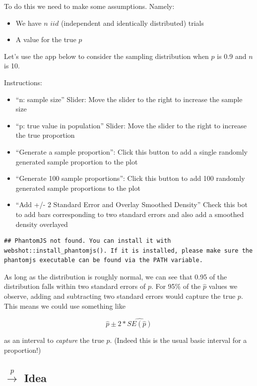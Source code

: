 \documentclass[
]{article}
\providecommand{\tightlist}{%
  \setlength{\itemsep}{0pt}\setlength{\parskip}{0pt}}
\begin{document}
To do this we need to make some assumptions. Namely:

\begin{itemize}
\tightlist
\item
  We have \(n\) \(iid\) (independent and identically distributed) trials
\item
  A value for the true \(p\)
\end{itemize}

Let's use the app below to consider the sampling distribution when \(p\)
is 0.9 and \(n\) is 10.

Instructions:

\begin{itemize}
\tightlist
\item
  ``n: sample size'' Slider: Move the slider to the right to increase
  the sample size
\item
  ``p: true value in population'' Slider: Move the slider to the right
  to increase the true proportion
\item
  ``Generate a sample proportion'': Click this button to add a single
  randomly generated sample proportion to the plot
\item
  ``Generate 100 sample proportions'': Click this button to add 100
  randomly generated sample proportions to the plot
\item
  ``Add +/- 2 Standard Error and Overlay Smoothed Density'' Check this
  bot to add bars corresponding to two standard errors and also add a
  smoothed density overlayed
\end{itemize}

\begin{verbatim}
## PhantomJS not found. You can install it with webshot::install_phantomjs(). If it is installed, please make sure the phantomjs executable can be found via the PATH variable.
\end{verbatim}

As long as the distribution is roughly normal, we can see that 0.95 of
the distribution falls within two standard errors of \(p\). For 95\% of
the \(\hat{p}\) values we observe, adding and subtracting two standard
errors would capture the true \(p\). This means we could use something
like

\[\hat{p}\pm 2*\widehat{SE(\hat{p})}\]

as an interval to \emph{capture} the true \(p\). (Indeed this is the
usual basic interval for a proportion!)

\hypertarget{stackrelprightarrow-idea}{%
\subsection{\texorpdfstring{\(\stackrel{p}{\rightarrow}\)
Idea}{\textbackslash stackrel\{p\}\{\textbackslash rightarrow\} Idea}}\label{stackrelprightarrow-idea}}
\end{document}
